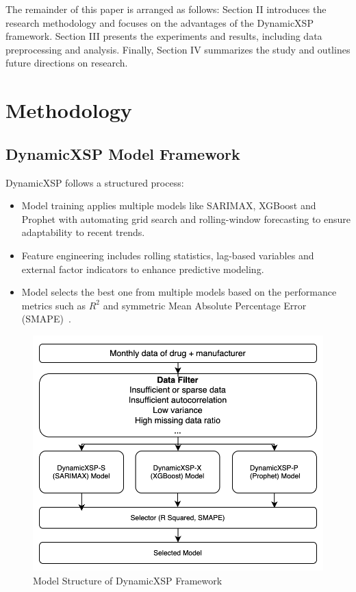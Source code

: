 \documentclass[12pt]{article}
\begin{document}
The remainder of this paper is arranged as follows: Section II introduces the research methodology and focuses on the advantages of the DynamicXSP framework. Section III presents the experiments and results, including data preprocessing and analysis. Finally, Section IV summarizes the study and outlines future directions on research.

\section{Methodology}
\subsection{DynamicXSP Model Framework}

 DynamicXSP follows a structured process:

\begin{itemize}
    \item Model training applies multiple models like SARIMAX, XGBoost and Prophet with automating grid search and rolling-window forecasting to ensure adaptability to recent trends.
    \item Feature engineering includes rolling statistics, lag-based variables and external factor indicators to enhance predictive modeling.
    \item Model selects the best one from multiple models based on the performance metrics such as \( R^2 \) and symmetric Mean Absolute Percentage Error (SMAPE)~\cite{hyndman2006accuracy}.
\end{itemize}

\begin{figure}[H]
    \centering
    \includegraphics[width=\linewidth]{./model_structure.png}
    \caption{Model Structure of DynamicXSP Framework}
    \label{fig:vitaminb1}
\end{figure}
\end{document}
